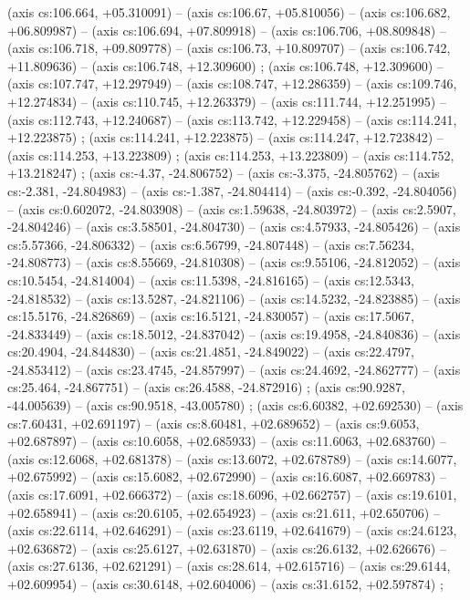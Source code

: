     (axis cs:106.664,    +05.310091) --  (axis cs:106.67,    +05.810056) --  (axis cs:106.682,    +06.809987) --  (axis cs:106.694,    +07.809918) --  (axis cs:106.706,    +08.809848) --  (axis cs:106.718,    +09.809778) --  (axis cs:106.73,    +10.809707) --  (axis cs:106.742,    +11.809636) --  (axis cs:106.748,    +12.309600) ;
    (axis cs:106.748,    +12.309600) --  (axis cs:107.747,    +12.297949) --  (axis cs:108.747,    +12.286359) --  (axis cs:109.746,    +12.274834) --  (axis cs:110.745,    +12.263379) --  (axis cs:111.744,    +12.251995) --  (axis cs:112.743,    +12.240687) --  (axis cs:113.742,    +12.229458) --  (axis cs:114.241,    +12.223875) ;
    (axis cs:114.241,    +12.223875) --  (axis cs:114.247,    +12.723842) --  (axis cs:114.253,    +13.223809) ;
    (axis cs:114.253,    +13.223809) --  (axis cs:114.752,    +13.218247) ;
    (axis cs:-4.37,    -24.806752) --  (axis cs:-3.375,    -24.805762) --  (axis cs:-2.381,    -24.804983) --  (axis cs:-1.387,    -24.804414) --  (axis cs:-0.392,    -24.804056) --  (axis cs:0.602072,    -24.803908) --  (axis cs:1.59638,    -24.803972) --  (axis cs:2.5907,    -24.804246) --  (axis cs:3.58501,    -24.804730) --  (axis cs:4.57933,    -24.805426) --  (axis cs:5.57366,    -24.806332) --  (axis cs:6.56799,    -24.807448) --  (axis cs:7.56234,    -24.808773) --  (axis cs:8.55669,    -24.810308) --  (axis cs:9.55106,    -24.812052) --  (axis cs:10.5454,    -24.814004) --  (axis cs:11.5398,    -24.816165) --  (axis cs:12.5343,    -24.818532) --  (axis cs:13.5287,    -24.821106) --  (axis cs:14.5232,    -24.823885) --  (axis cs:15.5176,    -24.826869) --  (axis cs:16.5121,    -24.830057) --  (axis cs:17.5067,    -24.833449) --  (axis cs:18.5012,    -24.837042) --  (axis cs:19.4958,    -24.840836) --  (axis cs:20.4904,    -24.844830) --  (axis cs:21.4851,    -24.849022) --  (axis cs:22.4797,    -24.853412) --  (axis cs:23.4745,    -24.857997) --  (axis cs:24.4692,    -24.862777) --  (axis cs:25.464,    -24.867751) --  (axis cs:26.4588,    -24.872916) ;
    (axis cs:90.9287,    -44.005639) --  (axis cs:90.9518,    -43.005780) ;
    (axis cs:6.60382,    +02.692530) --  (axis cs:7.60431,    +02.691197) --  (axis cs:8.60481,    +02.689652) --  (axis cs:9.6053,    +02.687897) --  (axis cs:10.6058,    +02.685933) --  (axis cs:11.6063,    +02.683760) --  (axis cs:12.6068,    +02.681378) --  (axis cs:13.6072,    +02.678789) --  (axis cs:14.6077,    +02.675992) --  (axis cs:15.6082,    +02.672990) --  (axis cs:16.6087,    +02.669783) --  (axis cs:17.6091,    +02.666372) --  (axis cs:18.6096,    +02.662757) --  (axis cs:19.6101,    +02.658941) --  (axis cs:20.6105,    +02.654923) --  (axis cs:21.611,    +02.650706) --  (axis cs:22.6114,    +02.646291) --  (axis cs:23.6119,    +02.641679) --  (axis cs:24.6123,    +02.636872) --  (axis cs:25.6127,    +02.631870) --  (axis cs:26.6132,    +02.626676) --  (axis cs:27.6136,    +02.621291) --  (axis cs:28.614,    +02.615716) --  (axis cs:29.6144,    +02.609954) --  (axis cs:30.6148,    +02.604006) --  (axis cs:31.6152,    +02.597874) ;
